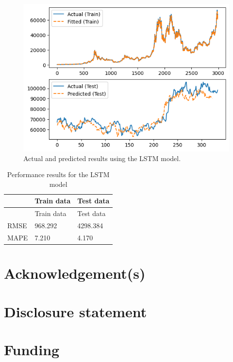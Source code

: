 \documentclass[]{interact}
\theoremstyle{plain}%
\theoremstyle{definition}
\theoremstyle{remark}
\begin{document}
\begin{figure}[H]

{\centering \includegraphics[width=0.8\linewidth]{LSTM_pred} 

}

\caption{Actual and predicted results using the LSTM model.}\label{fig:unnamed-chunk-3}
\end{figure}

\begin{longtable}[]{@{}lll@{}}
\caption{Performance results for the LSTM model}\tabularnewline
\toprule\noalign{}
& Train data & Test data \\
\midrule\noalign{}
\endfirsthead
\toprule\noalign{}
& Train data & Test data \\
\midrule\noalign{}
\endhead
\bottomrule\noalign{}
\endlastfoot
RMSE & 968.292 & 4298.384 \\
MAPE & 7.210 & 4.170 \\
\end{longtable}

\section*{Acknowledgement(s)}\label{acknowledgements}

\section*{Disclosure statement}\label{disclosure-statement}

\section*{Funding}\label{funding}
\end{document}
